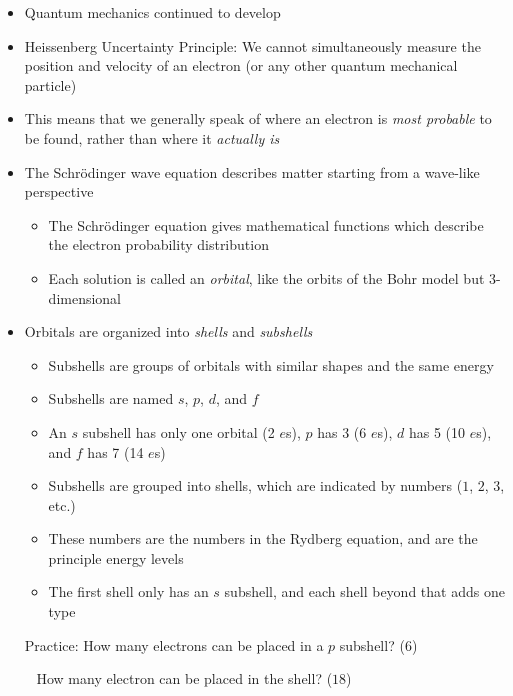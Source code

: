 \documentclass[12pt, openany, letterpaper]{memoir}
\begin{document}
\begin{itemize}
	\item Quantum mechanics continued to develop
	\item Heissenberg Uncertainty Principle: We cannot simultaneously measure the position and velocity of an electron (or any other quantum mechanical particle)
	\item This means that we generally speak of where an electron is \emph{most probable} to be found, rather than where it \emph{actually is}
	\item The Schr\"odinger wave equation describes matter starting from a wave-like perspective
	      \begin{itemize}
		      \item The Schr\"odinger equation gives mathematical functions which describe the electron probability distribution
		      \item Each solution is called an \emph{orbital}, like the orbits of the Bohr model but 3-dimensional
	      \end{itemize}
	\item Orbitals are organized into \emph{shells} and \emph{subshells}
	      \begin{itemize}
		      \item Subshells are groups of orbitals with similar shapes and the same energy
		      \item Subshells are named $s$, $p$, $d$, and $f$
		      \item An $s$ subshell has only one orbital (2 $e$s), $p$ has 3 (6 $e$s), $d$ has 5 (10 $e$s), and $f$ has 7 (14 $e$s)
		      \item Subshells are grouped into shells, which are indicated by numbers ($1$, $2$, $3$, etc.)
		      \item These numbers are the numbers in the Rydberg equation, and are the principle energy levels
		      \item The first shell only has an $s$ subshell, and each shell beyond that adds one type
	      \end{itemize}
	      Practice: How many electrons can be placed in a $p$ subshell? ($6$)

	      ~\hphantom{Practice:} How many electron can be placed in the  shell? ($18$)


\end{itemize}
\end{document}
